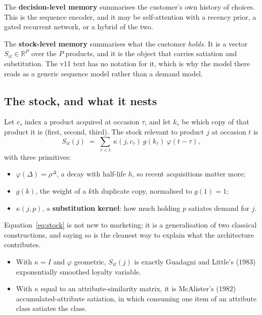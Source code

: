\documentclass[11pt]{article}
\begin{document}
The \textbf{decision-level memory} summarises the customer's own history of
choices. This is the sequence encoder, and it may be self-attention with a
recency prior, a gated recurrent network, or a hybrid of the two.

The \textbf{stock-level memory} summarises what the customer \emph{holds}. It is
a vector $S_{it}\in\mathbb{R}^{P}$ over the $P$ products, and it is the object
that carries satiation and substitution. The v11 text has no notation for it,
which is why the model there reads as a generic sequence model rather than a
demand model.

\subsection*{The stock, and what it nests}

Let $c_\tau$ index a product acquired at occasion $\tau$, and let $k_\tau$ be
which copy of that product it is (first, second, third). The stock relevant to
product $j$ at occasion $t$ is
\begin{equation}
S_{it}(j)\;=\;\sum_{\tau<t}\ \kappa(j,c_\tau)\ g(k_\tau)\ \varphi(t-\tau),
\label{eq:stock}
\end{equation}
with three primitives:
\begin{itemize}
\item $\varphi(\Delta)=\rho^{\Delta}$, a decay with half-life $h$, so recent
acquisitions matter more;
\item $g(k)$, the weight of a $k$th duplicate copy, normalised to $g(1)=1$;
\item $\kappa(j,p)$, a \textbf{substitution kernel}: how much holding $p$
satiates demand for $j$.
\end{itemize}

Equation~\eqref{eq:stock} is not new to marketing; it is a generalisation of two
classical constructions, and saying so is the cleanest way to explain what the
architecture contributes.

\begin{itemize}
\item With $\kappa=I$ and $\varphi$ geometric, $S_{it}(j)$ is exactly Guadagni
and Little's (1983) exponentially smoothed loyalty variable.
\item With $\kappa$ equal to an attribute-similarity matrix, it is McAlister's
(1982) accumulated-attribute satiation, in which consuming one item of an
attribute class satiates the class.
\end{itemize}
\end{document}
